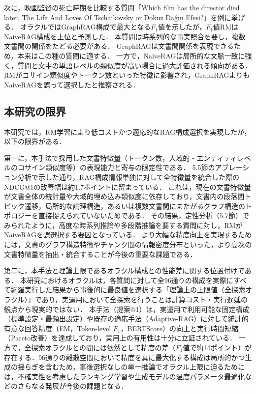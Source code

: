次に，映画監督の死亡時期を比較する質問「Which film has the director died later, The Life And Loves Of Tschaikovsky or Dokuz Dağın Efesi?」を例に挙げる．
オラクルではGraphRAG構成で最大となる$F_1$値を示したが，$F_1$値RMはNaiveRAG構成を上位と予測した．
本質問は時系列的な事実照合を要し，複数文書間の関係をたどる必要がある．
GraphRAGは文書間関係を表現できるため，本来はこの種の質問に適する．
一方で，NaiveRAGは局所的な文脈一致に強く，質問と文中の単語レベルの類似度が高い場合に過大評価される傾向がある．
RMがコサイン類似度やトークン数といった特徴に影響され，GraphRAGよりもNaiveRAGを誤って選択したと推察される．

\subsection{本研究の限界} \label{sec5.8}
本研究では，RM学習により低コストかつ適応的なRAG構成選択を実現したが，以下の限界がある．

第一に，本手法で採用した文書特徴量（トークン数，大域的・エンティティレベルのコサイン類似度等）の表現能力と寄与の限定性である．
5.5節のアブレーション分析で示した通り，RAG構成情報単独に対して全特徴量を統合した際のNDCG@1の改善幅は約1.7ポイントに留まっている．
これは，現在の文書特徴量が文書全体の統計量や大域的埋め込み類似度に依存しており，文書内の段落間トピック遷移，局所的な論理構造，あるいは複数文書間にまたがるグラフ構造のトポロジーを直接捉えられていないためである．
その結果，定性分析（5.7節）でみられたように，高度な時系列推論や多段階推論を要する質問に対し，RMがNaiveRAGを誤選択する要因となっている．
より大幅な精度向上を実現するためには，文書のグラフ構造特徴やチャンク間の情報密度分布といった，より高次の文書特徴量を抽出・統合することが今後の重要な課題である．

第二に，本手法と理論上限であるオラクル構成との性能差に関する位置付けである．
本研究におけるオラクルは，各質問に対して全96通りの構成を実際にすべて網羅実行した結果から事後的に最良値を選択する「理論上の上限値（全探索オラクル）」であり，実運用において全探索を行うことは計算コスト・実行遅延の観点から現実的ではない．
本手法（提案@1）は，実運用で利用可能な固定構成（標準設定・最頻出設定）や既存の適応手法（Adaptive-RAG）に対して統計的有意な回答精度（EM，Token-level $F_1$，BERTScore）の向上と実行時間短縮（Pareto改善）を達成しており，実用上の有用性は十分に立証されている．
一方で，全探索オラクルとの間には依然として精度の差（$F_1$値で約14ポイント）が存在する．96通りの離散空間において精度を真に最大化する構成は局所的かつ生成の揺らぎを含むため，事後選択なしの単一推論でオラクル上限に迫るためには，不確実性を考慮したランキング学習や生成モデルの温度パラメータ最適化などのさらなる発展が今後の課題となる．

